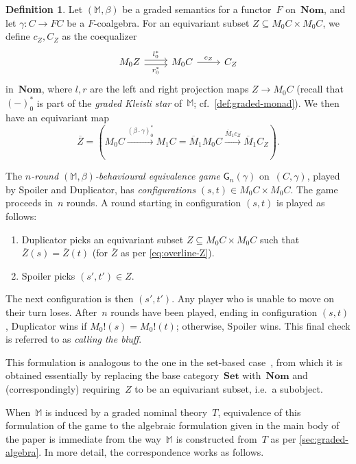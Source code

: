 \documentclass[a4paper,UKenglish,cleveref,thm-restate,numberwithinsect,final]{lipics-v2021}
\newcommand{\game}{\mathsf{G}}
\newcommand{\mbar}{\overline{M}_1}
\theoremstyle{plain}
\numberwithin{equation}{section}
\newcommand{\monad}{{\mathbb{M}}}
\newcommand{\Set}{\mathbf{Set}}
\newcommand{\+}[1]{\mathcal{#1}\xspace}
\newcommand{\Nom}{\mathbf{Nom}}
\theoremstyle{definition}
\newtheorem{defn}[theorem]{Definition}
\begin{document}
\begin{defn}\label{def:game}
  Let $(\monad,\beta)$ be a graded semantics for a functor~$F$
  on~$\Nom$, and let $\gamma\colon C\to FC$ be a $F$-coalgebra. For an
  equivariant subset $Z\subseteq M_0C\times M_0C$, we define $c_Z,C_Z$
  as the coequalizer
  \begin{equation*}
    \begin{tikzcd}
      M_0Z\arrow[r,"l_0^*",shift left]\arrow[r,"r_0^*" below,shift right]
      & M_0C \arrow[r,"c_Z"] & C_Z
    \end{tikzcd}
  \end{equation*}
  in~$\Nom$, where $l,r$ are the left and right projection maps
  $Z\to M_0C$ (recall that~$(-)_0^*$ is part of the \emph{graded
    Kleisli star} of~$\monad$; cf.~\cref{def:graded-monad}). We then
  have an equivariant map
  \begin{equation}\label{eq:overline-Z}
    \overline Z =(M_0 C \xrightarrow{(\beta\cdot\gamma)_0^*}M_1C=\mbar M_0C\xrightarrow{\mbar c_Z}\mbar C_Z).
  \end{equation}

  The \emph{$n$-round $(\monad,\beta)$-behavioural equivalence game}
  $\game_n(\gamma)$ on~$(C,\gamma)$, played by Spoiler  and
  Duplicator, has \emph{configurations}
  $(s,t)\in M_0C\times M_0C$. The game proceeds in~$n$ rounds. A round
  starting in configuration $(s,t)$ is played as follows:
  \begin{enumerate}
  \item Duplicator picks an equivariant subset
    $Z\subseteq M_0C\times M_0C$ such that
    $\overline Z(s)=\overline Z(t)$ (for $\overline Z$ as per
    \eqref{eq:overline-Z}).
  \item Spoiler picks $(s',t')\in Z$.
  \end{enumerate}
  The next configuration is then $(s',t')$. Any player who is unable
  to move on their turn loses. After~$n$ rounds have been played,
  ending in configuration $(s,t)$, Duplicator wins if
  $M_0!(s)=M_0!(t)$; otherwise, Spoiler wins. This final
  check is referred to as \emph{calling the bluff}.
\end{defn}
This formulation is analogous to the one in the set-based
case~\cite{FordEA22}, from which it is obtained essentially by
replacing the base category~$\Set$ with~$\Nom$ and (correspondingly)
requiring~$Z$ to be an equivariant subset, i.e.\ a subobject.

When~$\monad$ is induced by a graded nominal theory~$T$, equivalence
of this formulation of the game to the algebraic formulation given in
the main body of the paper is immediate from the way~$\monad$ is
constructed from~$T$ as per \cref{sec:graded-algebra}. In more detail,
the correspondence works as follows. 
\end{document}
